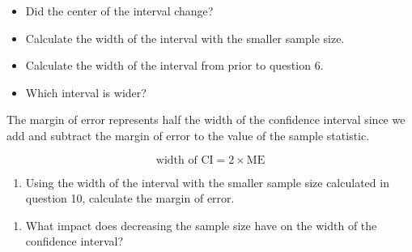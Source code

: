 \documentclass[
]{report}
\providecommand{\tightlist}{%
  \setlength{\itemsep}{0pt}\setlength{\parskip}{0pt}}
\begin{document}
\begin{itemize}
\tightlist
\item
  Did the center of the interval change?
\end{itemize}

\vspace{0.2in}

\begin{itemize}
\tightlist
\item
  Calculate the width of the interval with the smaller sample size.
\end{itemize}

\vspace{0.5in}

\begin{itemize}
\tightlist
\item
  Calculate the width of the interval from prior to question 6.
\end{itemize}

\vspace{0.5in}

\begin{itemize}
\tightlist
\item
  Which interval is wider?
\end{itemize}

\vspace{0.4in}

The margin of error represents half the width of the confidence interval since we add and subtract the margin of error to the value of the sample statistic.

\[\text{width of CI} = 2 \times \text{ME}\]

\begin{enumerate}
\def\labelenumi{\arabic{enumi}.}
\setcounter{enumi}{10}
\tightlist
\item
  Using the width of the interval with the smaller sample size calculated in question 10, calculate the margin of error.
\end{enumerate}

\vspace{0.4in}

\begin{enumerate}
\def\labelenumi{\arabic{enumi}.}
\setcounter{enumi}{11}
\tightlist
\item
  What impact does decreasing the sample size have on the width of the confidence interval?
\end{enumerate}

\vspace{0.2in}
\end{document}
